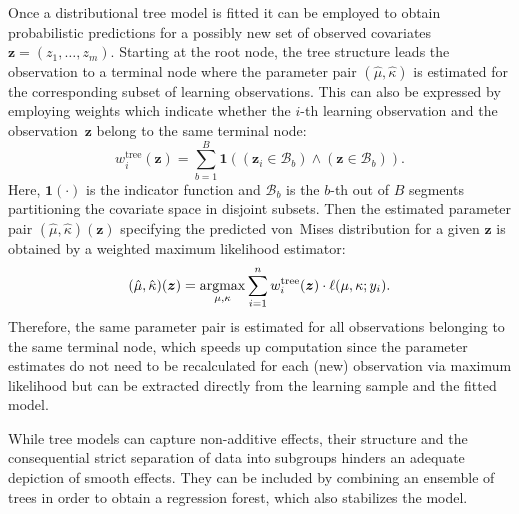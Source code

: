 \documentclass{statsoc}
\newcommand{\argmax}{\operatorname{argmax}\displaylimits}
\begin{document}
Once a distributional tree model is fitted it can be employed to obtain
probabilistic predictions for a possibly new set of observed covariates $\bm{z}
= (z_1, \ldots, z_m)$. Starting at the root node, the tree structure leads the
observation to a terminal node where the parameter pair $(\hat{\mu},
\hat{\kappa})$ is estimated for the corresponding subset of learning
observations. This can also be expressed by employing weights which indicate
whether the $i$-th learning observation and the observation~$\bm{z}$ belong to
the same terminal node: 
\begin{equation}
  w^{\text{tree}}_i(\bm{z}) = \sum_{b=1}^B \mathbf{1}((\bm{z}_i \in
  \mathcal{B}_b) \land (\bm{z} \in \mathcal{B}_b)).
\end{equation} 
Here, $\mathbf{1}(\cdot)$ is the indicator function and $\mathcal{B}_b$ is the
$b$-th out of $B$ segments partitioning the covariate space in disjoint
subsets. Then the estimated parameter pair $(\hat{\mu},\hat{\kappa})(\bm{z})$
specifying the predicted von~Mises distribution for a given $\bm{z}$ is
obtained by a weighted maximum likelihood estimator:
\begin{equation} 
  (\hat{\mu},\hat{\kappa})(\bm{z}) =
  \argmax_{\mu,\kappa} \sum_{i=1}^n w^{\text{tree}}_i(\bm{z}) \cdot
  \ell(\mu,\kappa; y_i).
\end{equation}
Therefore, the same parameter pair is estimated for all observations belonging
to the same terminal node, which speeds up computation since the parameter
estimates do not need to be recalculated for each (new) observation via maximum
likelihood but can be extracted directly from the learning sample and the
fitted model.

While tree models can capture non-additive effects, their structure and the
consequential strict separation of data into subgroups hinders an adequate
depiction of smooth effects. They can be included by combining an ensemble of
trees in order to obtain a regression forest, which also stabilizes the model. 
\end{document}
